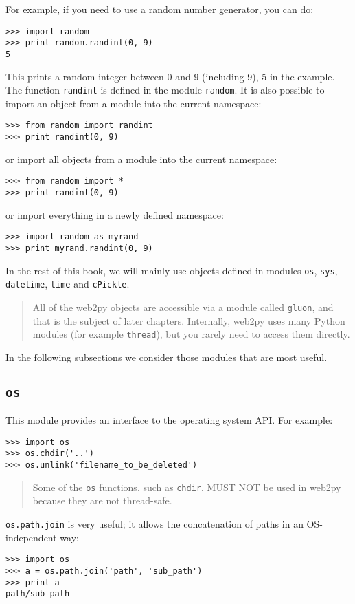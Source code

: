 \documentclass[justified,sixbynine,notoc]{tufte-book}
\def\ft{\small\tt}
\def\inxx#1{\index{#1}}
\begin{document}
\begin{fullwidth}
For example, if you need to use a random number generator, you can do:
\begin{lstlisting}
>>> import random
>>> print random.randint(0, 9)
5
\end{lstlisting}

This prints a random integer between 0 and 9 (including 9), 5 in the example. The function {\ft randint} is defined in the module {\ft random}. It is also possible to import an object from a module into the current namespace:
\begin{lstlisting}
>>> from random import randint
>>> print randint(0, 9)
\end{lstlisting}
\noindent or import all objects from a module into the current namespace:
\begin{lstlisting}
>>> from random import *
>>> print randint(0, 9)
\end{lstlisting}
\noindent or import everything in a newly defined namespace:
\begin{lstlisting}
>>> import random as myrand
>>> print myrand.randint(0, 9)
\end{lstlisting}

In the rest of this book, we will mainly use objects defined in modules {\ft os}, {\ft sys}, {\ft datetime}, {\ft time} and {\ft cPickle}.

\begin{quote}All of the web2py objects are accessible via a module called {\ft gluon}, and that is the subject of later chapters. Internally, web2py uses many Python modules (for example {\ft thread}), but you rarely need to access them directly.\end{quote}
In the following subsections we consider those modules that are most useful.

\goodbreak\subsection{{\ft os}}

\inxx{os} \inxx{os.path.join} \inxx{os.unlink}

This module provides an interface to the operating system API. For example:
\begin{lstlisting}
>>> import os
>>> os.chdir('..')
>>> os.unlink('filename_to_be_deleted')
\end{lstlisting}

\begin{quote}Some of the {\ft os} functions, such as {\ft chdir}, MUST NOT be used in web2py because they are not thread-safe.\end{quote}{\ft os.path.join} is very useful; it allows the concatenation of paths in an OS-independent way:
\begin{lstlisting}
>>> import os
>>> a = os.path.join('path', 'sub_path')
>>> print a
path/sub_path
\end{lstlisting}


\end{fullwidth}
\end{document}
